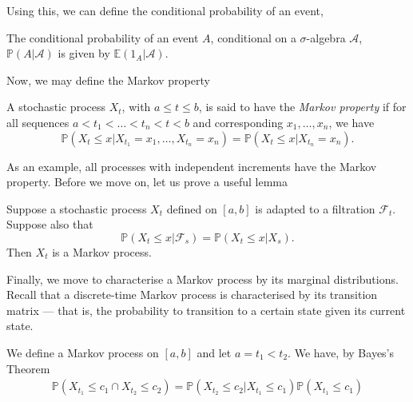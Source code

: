 \documentclass[prb,12pt]{revtex4-2}
\theoremstyle{definition}
\theoremstyle{definition}
\theoremstyle{definition}
\begin{document}
Using this, we can define the conditional probability of an event,
\begin{Definition}
	The conditional probability of an event $A$, conditional on a $\sigma$-algebra $\mathcal{A}$, $\mathbb{P}(A|\mathcal{A})$ is given by $\mathbb{E}(1_A|\mathcal{A})$.
\end{Definition}
Now, we may define the Markov property
\begin{Definition}
	A stochastic process $X_t$, with $a\le t \le b$, is said to have the \emph{Markov property} if for all sequences $a < t_1 < \dots < t_n < t < b$ and corresponding $x_1, \dots, x_n$, we have
	\[
	\mathbb{P}(X_t\le x|X_{t_1}=x_1, \dots, X_{t_n}=x_n) = \mathbb{P}(X_t\le x|X_{t_n}=x_n)
	.\] 
\end{Definition}
As an example, all processes with independent increments have the Markov property. 
Before we move on, let us prove a useful lemma
\begin{Lemma}
	Suppose a stochastic process $X_t$ defined on $[a,b]$ is adapted to a filtration $\mathcal{F}_t$. Suppose also that
	\[
	\mathbb{P}(X_t\le x|\mathcal{F}_s) = \mathbb{P}(X_t \le x|X_s)
	.\] 
	Then $X_t$ is a Markov process.
\end{Lemma}

Finally, we move to characterise a Markov process by its marginal distributions. Recall that a discrete-time Markov process is characterised by its transition matrix --- that is, the probability to transition to a certain state given its current state.

We define a Markov process on $[a,b]$ and let $a=t_1<t_2$. We have, by Bayes's Theorem
\begin{align*}
	\mathbb{P}(X_{t_1}\le c_1 \cap X_{t_2}\le c_2)=\mathbb{P}(X_{t_2}\le c_2 |X_{t_1}\le c_1)\mathbb{P}(X_{t_1}\le c_1)
\end{align*}


\end{document}
